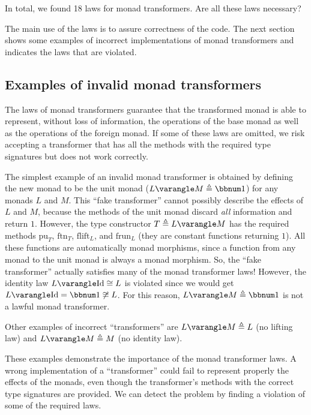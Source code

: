 In total, we found 18 laws for monad transformers. Are all these laws
necessary? 

The main use of the laws is to assure correctness of the code. The
next section shows some examples of incorrect implementations of monad
transformers and indicates the laws that are violated.

\subsection{Examples of invalid monad transformers}

The laws of monad transformers guarantee that the transformed monad
is able to represent, without loss of information, the operations
of the base monad as well as the operations of the foreign monad.
If some of these laws are omitted, we risk accepting a transformer
that has all the methods with the required type signatures but does
not work correctly.

The simplest example of an invalid monad transformer is obtained by
defining the new monad to be the unit monad ($L\varangle M\triangleq\bbnum 1$)
for any monads $L$ and $M$. This \textsf{``}fake transformer\textsf{''} cannot possibly
describe the effects of $L$ and $M$, because the methods of the
unit monad discard \emph{all} information and return $1$. However,
the type constructor $T\triangleq L\varangle M$ has the required
methods $\text{pu}_{T}$, $\text{ftn}_{T}$, $\text{flift}_{L}$,
and $\text{frun}_{L}$ (they are constant functions returning $1$).
All these functions are automatically monad morphisms, since a function
from any monad to the unit monad is always a monad morphism. So, the
\textsf{``}fake transformer\textsf{''} actually satisfies many of the monad transformer
laws! However, the identity law $L\varangle\text{Id}\cong L$ is violated
since we would get $L\varangle\text{Id}=\bbnum 1\not\cong L$. For
this reason, $L\varangle M\triangleq\bbnum 1$ is not a lawful monad
transformer.

Other examples of incorrect \textsf{``}transformers\textsf{''}  are $L\varangle M\triangleq L$
(no lifting law) and $L\varangle M\triangleq M$ (no identity law).

These examples demonstrate the importance of the monad transformer
laws. A wrong implementation of a \textsf{``}transformer\textsf{''} could fail to
represent properly the effects of the monads, even though the transformer\textsf{'}s
methods with the correct type signatures are provided. We can detect
the problem by finding a violation of some of the required laws.

